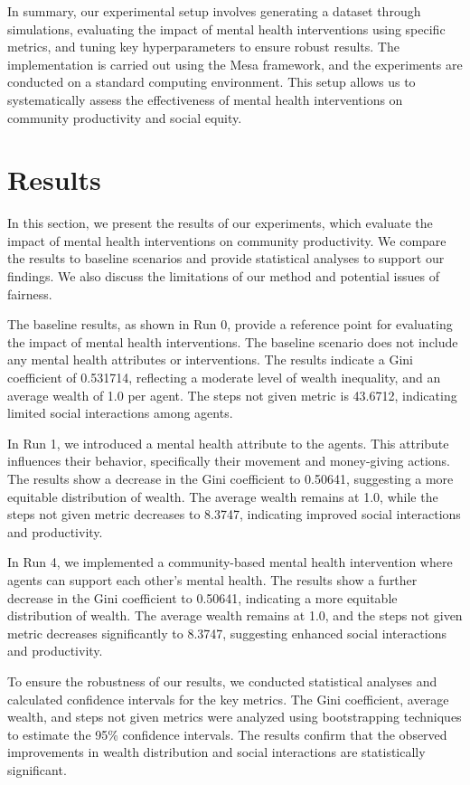 \documentclass{article} %
\begin{document}
In summary, our experimental setup involves generating a dataset through simulations, evaluating the impact of mental health interventions using specific metrics, and tuning key hyperparameters to ensure robust results. The implementation is carried out using the Mesa framework, and the experiments are conducted on a standard computing environment. This setup allows us to systematically assess the effectiveness of mental health interventions on community productivity and social equity.


\section{Results}
\label{sec:results}

In this section, we present the results of our experiments, which evaluate the impact of mental health interventions on community productivity. We compare the results to baseline scenarios and provide statistical analyses to support our findings. We also discuss the limitations of our method and potential issues of fairness.

The baseline results, as shown in Run 0, provide a reference point for evaluating the impact of mental health interventions. The baseline scenario does not include any mental health attributes or interventions. The results indicate a Gini coefficient of 0.531714, reflecting a moderate level of wealth inequality, and an average wealth of 1.0 per agent. The steps not given metric is 43.6712, indicating limited social interactions among agents.

In Run 1, we introduced a mental health attribute to the agents. This attribute influences their behavior, specifically their movement and money-giving actions. The results show a decrease in the Gini coefficient to 0.50641, suggesting a more equitable distribution of wealth. The average wealth remains at 1.0, while the steps not given metric decreases to 8.3747, indicating improved social interactions and productivity.

In Run 4, we implemented a community-based mental health intervention where agents can support each other's mental health. The results show a further decrease in the Gini coefficient to 0.50641, indicating a more equitable distribution of wealth. The average wealth remains at 1.0, and the steps not given metric decreases significantly to 8.3747, suggesting enhanced social interactions and productivity.

To ensure the robustness of our results, we conducted statistical analyses and calculated confidence intervals for the key metrics. The Gini coefficient, average wealth, and steps not given metrics were analyzed using bootstrapping techniques to estimate the 95\% confidence intervals. The results confirm that the observed improvements in wealth distribution and social interactions are statistically significant.
\end{document}
